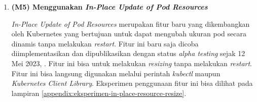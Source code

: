 \begin{enumerate}
    \item \textbf{(M5) Menggunakan \textit{In-Place Update of Pod Resources}}

    \textit{In-Place Update of Pod Resources} merupakan fitur baru yang dikembangkan oleh Kubernetes yang bertujuan untuk dapat mengubah ukuran pod secara dinamis tanpa melakukan \textit{restart}. Fitur ini baru saja dicoba diimplementasikan dan dipublikasikan dengan status \textit{alpha testing} sejak 12 Mei 2023, \parencite{kubeinplaceupdate}. Fitur ini bisa untuk melakukan \textit{resizing} tanpa melakukan \textit{restart}. Fitur ini bisa langsung digunakan melalui perintah \textit{kubectl} maupun \textit{Kubernetes Client Library}. Eksperimen penggunaan fitur ini bisa dilihat pada lampiran \ref{appendix:eksperimen-in-place-resource-resize}.

\end{enumerate}